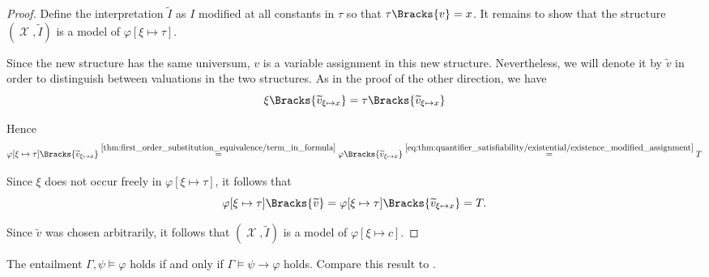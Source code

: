\begin{proof}
  Define the interpretation \( \widetilde I \) as \( I \) modified at all constants in \( \tau \) so that \( \tau\Bracks{v} = x \). It remains to show that the structure \( (\mscrX, \widetilde I) \) is a model of \( \varphi[\xi \mapsto \tau] \).

  Since the new structure has the same universum, \( v \) is a variable assignment in this new structure. Nevertheless, we will denote it by \( \widetilde v \) in order to distinguish between valuations in the two structures. As in the proof of the other direction, we have
  \begin{equation*}
    \xi\Bracks{\widetilde v_{\xi \mapsto x}}
    =
    \tau\Bracks{\widetilde v_{\xi \mapsto x}}
  \end{equation*}

  Hence
  \begin{equation*}
    \varphi[\xi \mapsto \tau]\Bracks{\widetilde v_{\xi \mapsto x}}
    \overset {\ref{thm:first_order_substitution_equivalence/term_in_formula}} =
    \varphi\Bracks{\widetilde v_{\xi \mapsto x}}
    \overset {\eqref{eq:thm:quantifier_satisfiability/existential/existence_modified_assignment}} =
    T
  \end{equation*}

  Since \( \xi \) does not occur freely in \( \varphi[\xi \mapsto \tau] \), it follows that
  \begin{equation*}
    \varphi[\xi \mapsto \tau]\Bracks{\widetilde v} = \varphi[\xi \mapsto \tau]\Bracks{\widetilde v_{\xi \mapsto x}} = T.
  \end{equation*}

  Since \( \widetilde v \) was chosen arbitrarily, it follows that \( (\mscrX, \widetilde I) \) is a model of \( \varphi[\xi \mapsto c] \).
\end{proof}

\begin{theorem}\label{thm:semantic_deduction_theorem}
  The entailment \( \Gamma, \psi \vDash \varphi \) holds if and only if \( \Gamma \vDash \psi \to \varphi \) holds. Compare this result to .
\end{theorem}
